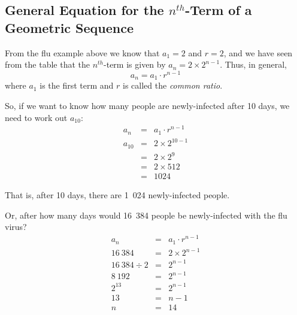 
\subsection{General Equation for the $n^{th}$-Term of a Geometric Sequence}

From the flu example above we know that $a_1 = 2$ and $r = 2$, and we have seen from the table that the
$n^{th}$-term is given by $a_n = 2 \times 2^{n-1}$. Thus, in general,
\begin{equation}
a_n = a_1 \cdot r^{n-1}
\end{equation}
where $a_1$ is the first term and $r$ is called the \textit{common ratio}. 

So, if we want to know how many people are newly-infected after 10 days, we need to work
out $a_{10}$:
\begin{eqnarray*}
a_n &=& a_1 \cdot r^{n-1} \\
a_{10} &=& 2 \times 2^{10-1} \\
&=& 2 \times 2^9 \\
&=& 2 \times 512 \\
&=& 1024
\end{eqnarray*}

That is, after 10 days, there are 1~024 newly-infected people.

Or, after how many days would 16~384 people be newly-infected with the flu virus?
\begin{eqnarray*}
a_n &=& a_1 \cdot r^{n-1} \\
16~384 &=& 2 \times 2^{n-1} \\
16~384 \div 2 &=& 2^{n-1} \\
8~192 &=& 2^{n-1} \\
2^{13} &=& 2^{n-1} \\
13 &=& n - 1 \\
n &=& 14
\end{eqnarray*}

